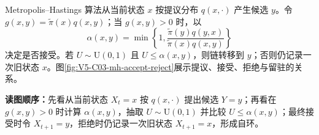 \documentclass[UTF8,a4paper,11pt,openany]{ctexbook}
\begin{document}
\setcounter{page}{636}
\setcounter{chapter}{32}
\setcounter{figure}{4}
\pagestyle{headings}
Metropolis--Hastings 算法从当前状态 $x$ 按提议分布 $q(x,\cdot)$ 产生候选 $y$。令
$g(x,y)=\widetilde\pi(x)q(x,y)$；当 $g(x,y)>0$ 时，以
\begin{equation}
\alpha(x,y)=\min\!\left\{1,
\frac{\widetilde\pi(y)q(y,x)}{\widetilde\pi(x)q(x,y)}\right\}
\end{equation}
决定是否接受。若 $U\sim\mathrm U(0,1)$ 且 $U\leq\alpha(x,y)$，则链转移到 $y$；否则仍记录一次旧状态 $x$。图\ref{fig:V5-C03-mh-accept-reject}展示提议、接受、拒绝与留驻的关系。

\FloatBarrier
\noindent\textbf{读图顺序：}先看从当前状态 $X_t=x$ 按 $q(x,\cdot)$ 提出候选 $Y=y$；再看在 $g(x,y)>0$ 时计算 $\alpha(x,y)$，抽取 $U\sim\mathrm U(0,1)$ 并比较 $U\le\alpha(x,y)$；最终接受时令 $X_{t+1}=y$，拒绝时仍记录一次旧状态 $X_{t+1}=x$，形成自环。
\end{document}
